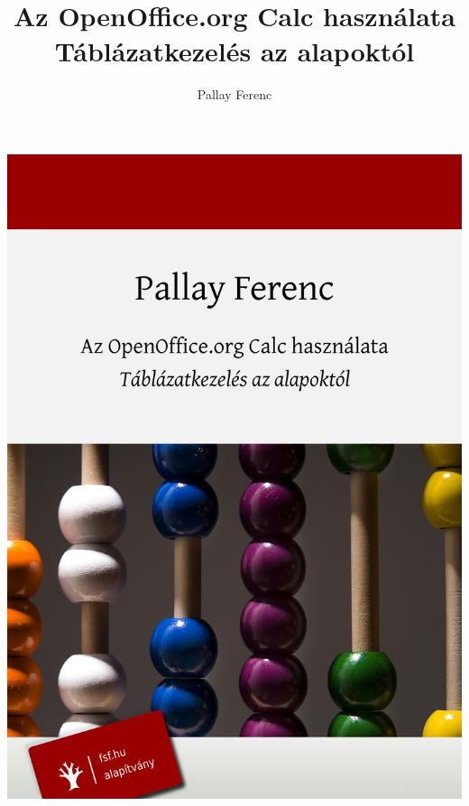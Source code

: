 \documentclass[a4paper,11pt,oneside]{book}
\author{Pallay Ferenc}
\title{\textbf{Az OpenOffice.org Calc használata}\\
    Táblázatkezelés az alapoktól}
\date{}
\begin{document}
\shipout\vbox{\parindent0pt\kern-1in\vbox{
\includegraphics[width=\paperwidth,height=\paperheight]{borito.jpg}}}

\thispagestyle{empty}
\maketitle

\thispagestyle{empty}
\end{document}
